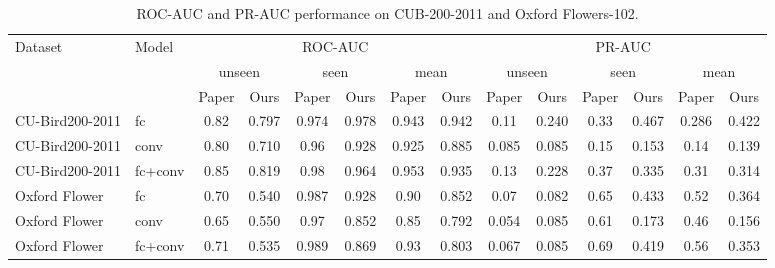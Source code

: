 \documentclass[11pt]{article}
\begin{document}
\begin{table}[t]
\centering
\scriptsize
\caption{ROC-AUC and PR-AUC performance on CUB-200-2011 and Oxford Flowers-102.}
\label{tab:table1}
\begin{tabular}{llcccccccccccc}
\toprule
Dataset & Model & \multicolumn{6}{c}{ROC-AUC} & \multicolumn{6}{c}{PR-AUC} \\
\cmidrule(lr){3-8} \cmidrule(lr){9-14}
 & & \multicolumn{2}{c}{unseen} & \multicolumn{2}{c}{seen} & \multicolumn{2}{c}{mean} & \multicolumn{2}{c}{unseen} & \multicolumn{2}{c}{seen} & \multicolumn{2}{c}{mean} \\
\cmidrule(lr){3-4} \cmidrule(lr){5-6} \cmidrule(lr){7-8} \cmidrule(lr){9-10} \cmidrule(lr){11-12} \cmidrule(lr){13-14}
 & & Paper & Ours & Paper & Ours & Paper & Ours & Paper & Ours & Paper & Ours & Paper & Ours \\
\midrule
CU-Bird200-2011 & fc & 0.82 & 0.797 & 0.974 & 0.978 & 0.943 & 0.942 & 0.11 & 0.240 & 0.33 & 0.467 & 0.286 & 0.422 \\
CU-Bird200-2011 & conv & 0.80 & 0.710 & 0.96 & 0.928 & 0.925 & 0.885 & 0.085 & 0.085 & 0.15 & 0.153 & 0.14 & 0.139 \\
CU-Bird200-2011 & fc+conv & 0.85 & 0.819 & 0.98 & 0.964 & 0.953 & 0.935 & 0.13 & 0.228 & 0.37 & 0.335 & 0.31 & 0.314 \\
Oxford Flower & fc & 0.70 & 0.540 & 0.987 & 0.928 & 0.90 & 0.852 & 0.07 & 0.082 & 0.65 & 0.433 & 0.52 & 0.364 \\
Oxford Flower & conv & 0.65 & 0.550 & 0.97 & 0.852 & 0.85 & 0.792 & 0.054 & 0.085 & 0.61 & 0.173 & 0.46 & 0.156 \\
Oxford Flower & fc+conv & 0.71 & 0.535 & 0.989 & 0.869 & 0.93 & 0.803 & 0.067 & 0.085 & 0.69 & 0.419 & 0.56 & 0.353 \\
 \bottomrule
\end{tabular}
\end{table}
\end{document}
